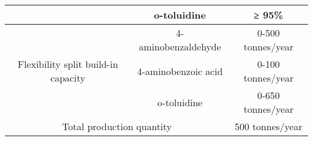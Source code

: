 \begin{landscape}
\begin{table}[]
\begin{tabular}{@{}ccc@{}}
\multicolumn{1}{|c|}{}                                                     & \multicolumn{1}{c|}{o-toluidine}         & \multicolumn{1}{c|}{≥ 95\%}                                                                                                                                                                                                                                                                                                                                                                                                                \\ \midrule
\multicolumn{1}{|c|}{\multirow{3}{*}{Flexibility split build-in capacity}} & \multicolumn{1}{c|}{4-aminobenzaldehyde} & \multicolumn{1}{c|}{0-500 tonnes/year}                                                                                                                                                                                                                                                                                                                                                                                                     \\ \cmidrule(l){2-3} 
\multicolumn{1}{|c|}{}                                                     & \multicolumn{1}{c|}{4-aminobenzoic acid} & \multicolumn{1}{c|}{0-100 tonnes/year}                                                                                                                                                                                                                                                                                                                                                                                                     \\ \cmidrule(l){2-3} 
\multicolumn{1}{|c|}{}                                                     & \multicolumn{1}{c|}{o-toluidine}         & \multicolumn{1}{c|}{0-650 tonnes/year}                                                                                                                                                                                                                                                                                                                                                                                                     \\ \midrule
\multicolumn{2}{|c|}{Total production quantity}                                                                       & \multicolumn{1}{c|}{500 tonnes/year}                                                                                                                                                                                                                                                                                                                                                                                                       \\ \midrule

\end{tabular}
\end{table}
\end{landscape}
